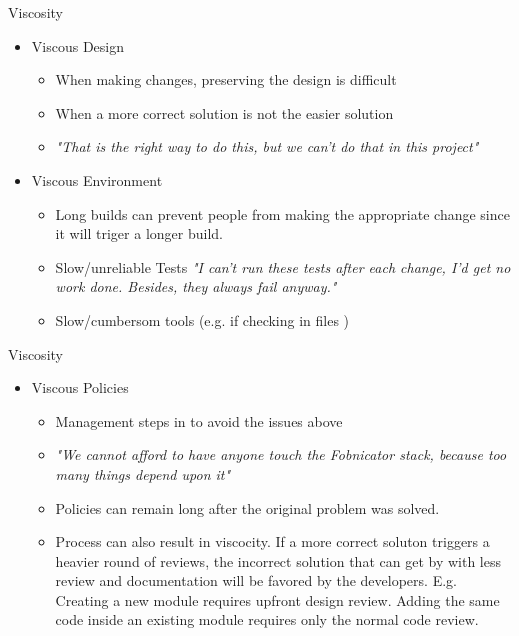 \documentclass[xcolor=svgnames, handout]{beamer}
\begin{document}
{%
%
\begin{frame}{Viscosity}

    \begin{itemize}
        \item<1->Viscous Design
        \begin{itemize}
            \item<3->When making changes, preserving the design is difficult
            \item<4->When a more correct solution is not the easier solution
            \item<5->\textit{"That is the right way to do this, but we can't do
                that in this project"}
        \end{itemize}
        \item<2->Viscous Environment
        \begin{itemize}
            \item<6->Long builds can prevent people from making the appropriate
                change since it will triger a longer build.
            \item<7->Slow/unreliable Tests \textit{"I can't run these tests
                after each change, I'd get no work done.  Besides, they always
                fail anyway."}
            \item<8->Slow/cumbersom tools (e.g. if checking in files )
        \end{itemize}
    \end{itemize}
\end{frame}
}

{%
%
\begin{frame}{Viscosity}
    \begin{itemize}
        \item Viscous Policies
        \begin{itemize}
            \item<1->Management steps in to avoid the issues above
            \item<2->\textit{"We cannot afford to have anyone touch the
                Fobnicator stack, because too many things depend upon it"}
            \item<3->Policies can remain long after the original problem was
                solved.
            \item<4->Process can also result in viscocity.  If a more correct
                soluton triggers a heavier round of reviews, the incorrect
                solution that can get by with less review and documentation will
                be favored by the developers.  E.g. Creating a new module
                requires upfront design review.  Adding the same code inside an
                existing module requires only the normal code review.
        \end{itemize}
    \end{itemize}
\end{frame}
}
\end{document}
